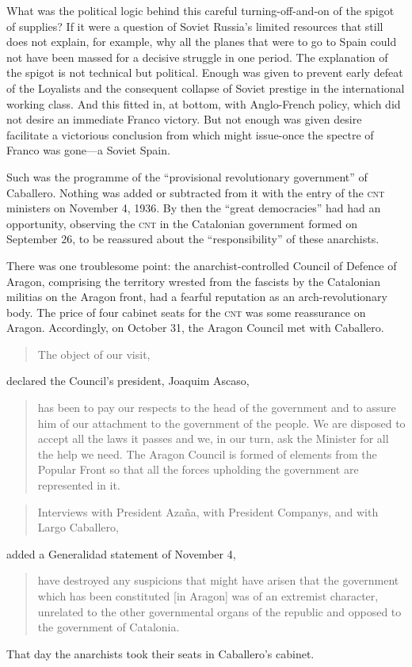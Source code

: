 What was the political logic behind this careful turning-off-and-on of the spigot of supplies? If it were a question of Soviet Russia’s limited resources that still does not explain, for example, why all the planes that were to go to Spain could not have been massed for a decisive struggle in one period. The explanation of the spigot is not technical but political. Enough was given to prevent early defeat of the Loyalists and the consequent collapse of Soviet prestige in the international working class. And this fitted in, at bottom, with Anglo-French policy, which did not desire an immediate Franco victory. But not enough was given desire facilitate a victorious conclusion from which might issue-once the spectre of Franco was gone---a Soviet Spain.

Such was the programme of the ``provisional revolutionary government'' of Caballero. Nothing was added or subtracted from it with the entry of the \textsc{cnt} ministers on November 4, 1936. By then the ``great democracies'' had had an opportunity, observing the \textsc{cnt} in the Catalonian government formed on September 26, to be reassured about the ``responsibility'' of these anarchists.

There was one troublesome point: the anarchist-controlled Council of Defence of Aragon, comprising the territory wrested from the fascists by the Catalonian militias on the Aragon front, had a fearful reputation as an arch-revolutionary body. The price of four cabinet seats for the \textsc{cnt} was some reassurance on Aragon. Accordingly, on October 31, the Aragon Council met with Caballero.
\nowidow

\begin{quotation}
	The object of our visit,
\end{quotation}
declared the Council’s president, Joaquim Ascaso,

\begin{quotation}
  \noindent
  has been to pay our respects to the head of the government and to assure him of our attachment to the government of the people. We are disposed to accept all the laws it passes and we, in our turn, ask the Minister for all the help we need. The Aragon Council is formed of elements from the Popular Front so that all the forces upholding the government are represented in it.
\end{quotation}

\separatorline

\begin{quotation}
  Interviews with President Azaña, with President Companys, and with Largo Caballero,
\end{quotation}
added a Generalidad statement of November 4,

\begin{quotation}
  \noindent
  have destroyed any suspicions that might have arisen that the government which has been constituted [in Aragon] was of an extremist character, unrelated to the other governmental organs of the republic and opposed to the government of Catalonia.
\end{quotation}
  
That day the anarchists took their seats in Caballero’s cabinet.